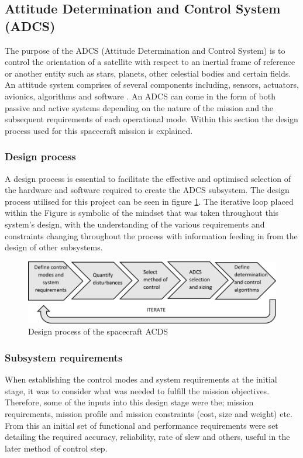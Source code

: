 \subsection{Attitude Determination and Control System (ADCS)}

The purpose of the ADCS (Attitude Determination and Control System) is to control
the orientation of a satellite with respect to an inertial frame of reference or
another entity such as stars, planets, other celestial bodies and certain fields.
An attitude system comprises of several components including, sensors, actuators,
avionics, algorithms and software \cite{ADCS_nasa}. An ADCS can come in the form of both passive
and active systems depending on the nature of the mission and the subsequent
requirements of each operational mode. Within this section the design process used
for this spacecraft mission is explained.

\subsubsection{Design process}
A design process is essential to facilitate the effective and optimised selection
of the hardware and software required to create the ADCS subsystem. The design
process utilised for this project can be seen in figure \ref{fig:adcs_design}.
The iterative loop placed within the Figure is symbolic of the mindset that was
taken throughout this system’s design, with the understanding of the various
requirements and constraints changing throughout the process with information
feeding in from the design of other subsystems.

\begin{figure}[h]
	\centering
	\includegraphics[width=\textwidth]{img/ADCS_design.png}
	\caption{Design process of the spacecraft ACDS}
	\label{fig:adcs_design}
\end{figure}

\subsubsection{Subsystem requirements}

When establishing the control modes and system requirements at the initial stage,
it was to consider what was needed to fulfill the mission objectives. Therefore,
some of the inputs into this design stage were the; mission requirements, mission
profile and mission constraints (cost, size and weight) etc. From this an initial
set of functional and performance requirements were set detailing the required
accuracy, reliability, rate of slew and others, useful in the later method of
control step.

